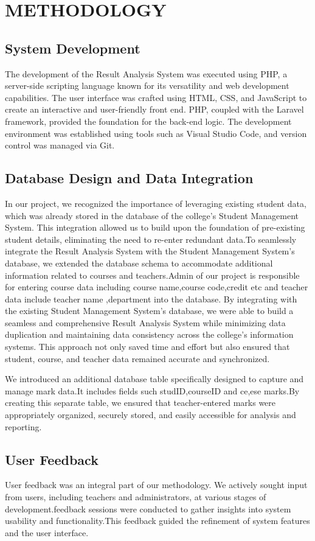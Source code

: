 \documentclass{nascproject}
\begin{document}
\chapter{METHODOLOGY}
\section{System Development}
The development of the Result Analysis System was executed using PHP, a server-side scripting language known for its versatility and web development capabilities. The user interface was crafted using HTML, CSS, and JavaScript to create an interactive and user-friendly front end. PHP, coupled with the Laravel framework, provided the foundation for the back-end logic. The development environment was established using tools such as Visual Studio Code, and version control was managed via Git.

\section{Database Design and Data Integration}
In our project, we recognized the importance of leveraging existing student data, which was already stored in the database of the college's Student Management System. This integration allowed us to build upon the foundation of pre-existing student details, eliminating the need to re-enter redundant data.To seamlessly integrate the Result Analysis System with the Student Management System's database, we extended the database schema to accommodate additional information related to courses and teachers.Admin of our project is responsible for entering course data including course name,course code,credit etc and teacher data include teacher name ,department into the database. By integrating with the existing Student Management System's database, we were able to build a seamless and comprehensive Result Analysis System while minimizing data duplication and maintaining data consistency across the college's information systems. This approach not only saved time and effort but also ensured that student, course, and teacher data remained accurate and synchronized.

We introduced an additional database table specifically designed to capture and manage mark data.It includes fields such studID,courseID and ce,ese marks.By creating this separate table, we ensured that teacher-entered marks were appropriately organized, securely stored, and easily accessible for analysis and reporting.
\section{User Feedback}
User feedback was an integral part of our methodology. We actively sought input from users, including teachers and administrators, at various stages of development.feedback sessions were conducted to gather insights into system usability and functionality.This feedback guided the refinement of system features and the user interface.
\end{document}
